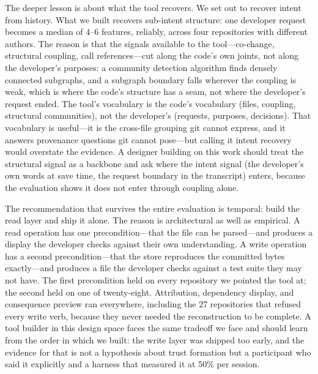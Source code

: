The deeper lesson is about what the tool recovers. We set out to recover intent
from history. What we built recovers sub-intent structure: one developer request
becomes a median of 4--6 features, reliably, across four repositories with
different authors. The reason is that the signals available to the
tool---co-change, structural coupling, call references---cut along the code's
own joints, not along the developer's purposes: a community detection algorithm
finds densely connected subgraphs, and a subgraph boundary falls wherever the
coupling is weak, which is where the code's structure has a seam, not where
the developer's request ended. The tool's vocabulary is the code's vocabulary
(files, coupling, structural communities), not the developer's (requests,
purposes, decisions). That vocabulary is useful---it is the cross-file grouping
git cannot express, and it answers provenance questions git cannot pose---but
calling it intent recovery would overstate the evidence. A designer building on
this work should treat the structural signal as a backbone and ask where the
intent signal (the developer's own words at save time, the request boundary in
the transcript) enters, because the evaluation shows it does not enter through
coupling alone.

The recommendation that survives the entire evaluation is temporal: build the
read layer and ship it alone. The reason is architectural as well as empirical. A read operation has one precondition---that the file can be
parsed---and produces a display the developer checks against their own
understanding. A write operation has a second precondition---that the
store reproduces the committed bytes exactly---and produces a file the
developer checks against a test suite they may not have. The first
precondition held on every repository we pointed the tool at; the second
held on one of twenty-eight. Attribution, dependency display, and consequence
preview ran everywhere, including the 27 repositories that refused every write
verb, because they never needed the reconstruction to be complete. A tool
builder in this design space faces the same tradeoff we face and should learn
from the order in which we built: the write layer was shipped too early, and
the evidence for that is not a hypothesis about trust formation but a
participant who said it explicitly and a harness that measured it at 50\% per
session.

